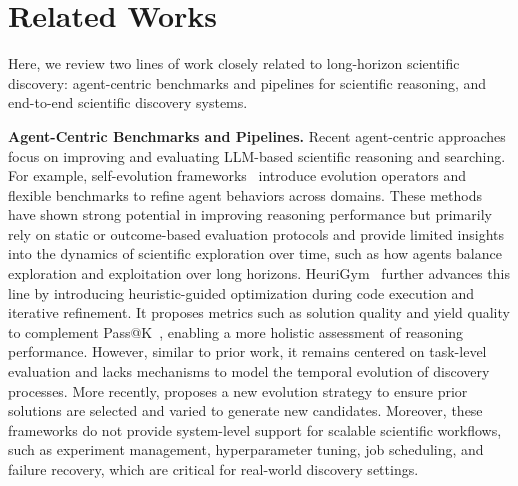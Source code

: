 \section{Related Works}
Here, we review two lines of work closely related to long-horizon scientific discovery: agent-centric benchmarks and pipelines for scientific reasoning, and end-to-end scientific discovery systems.


{\noindent\bf Agent-Centric Benchmarks and Pipelines.} Recent agent-centric approaches focus on improving and evaluating LLM-based scientific reasoning and searching. For example, self-evolution frameworks~\citep{mlagentbench, lin2025se, aira} introduce evolution operators and flexible benchmarks to refine agent behaviors across domains. These methods have shown strong potential in improving reasoning performance but primarily rely on static or outcome-based evaluation protocols and provide limited insights into the dynamics of scientific exploration over time, such as how agents balance exploration and exploitation over long horizons. HeuriGym~\citep{chen2025heurigym} further advances this line by introducing heuristic-guided optimization during code execution and iterative refinement. It proposes metrics such as solution quality and yield quality to complement Pass@K~\cite{chen2021evaluating}, enabling a more holistic assessment of reasoning performance. However, similar to prior work, it remains centered on task-level evaluation and lacks mechanisms to model the temporal evolution of discovery processes. More recently, \cite{liu2026evox} proposes a new evolution strategy to ensure prior solutions are selected and varied to generate new candidates. Moreover, these frameworks do not provide system-level support for scalable scientific workflows, such as experiment management, hyperparameter tuning, job scheduling, and failure recovery, which are critical for real-world discovery settings. 


